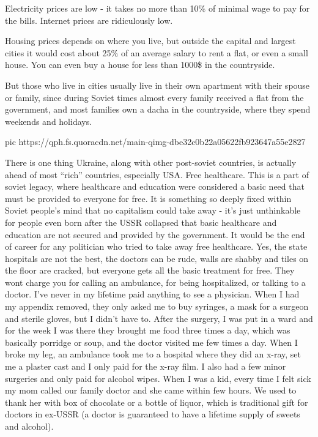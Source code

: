 Electricity prices are low - it takes no more than 10\% of minimal wage to pay
for the bills. Internet prices are ridiculously low.

Housing prices depends on where you live, but outside the capital and largest
cities it would cost about 25\% of an average salary to rent a flat, or even a
small house. You can even buy a house for less than 1000\$ in the countryside.

But those who live in cities usually live in their own apartment with their
spouse or family, since during Soviet times almost every family received a flat
from the government, and most families own a dacha in the countryside, where
they spend weekends and holidays.

\ifcmt
	pic https://qph.fs.quoracdn.net/main-qimg-dbe32c0b22a05622fb923647a55e2827
\fi

There is one thing Ukraine, along with other post-soviet countries, is actually
ahead of most “rich” countries, especially USA. Free healthcare. This is a part
of soviet legacy, where healthcare and education were considered a basic need
that must be provided to everyone for free. It is something so deeply fixed
within Soviet people’s mind that no capitalism could take away - it’s just
unthinkable for people even born after the USSR collapsed that basic healthcare
and education are not secured and provided by the government. It would be the
end of career for any politician who tried to take away free healthcare. Yes,
the state hospitals are not the best, the doctors can be rude, walls are shabby
and tiles on the floor are cracked, but everyone gets all the basic treatment
for free. They wont charge you for calling an ambulance, for being
hospitalized, or talking to a doctor. I’ve never in my lifetime paid anything
to see a physician. When I had my appendix removed, they only asked me to buy
syringes, a mask for a surgeon and sterile gloves, but I didn’t have to. After
the surgery, I was put in a ward and for the week I was there they brought me
food three times a day, which was basically porridge or soup, and the doctor
visited me few times a day. When I broke my leg, an ambulance took me to a
hospital where they did an x-ray, set me a plaster cast and I only paid for the
x-ray film. I also had a few minor surgeries and only paid for alcohol wipes.
When I was a kid, every time I felt sick my mom called our family doctor and
she came within few hours. We used to thank her with box of chocolate or a
bottle of liquor, which is traditional gift for doctors in ex-USSR (a doctor is
guaranteed to have a lifetime supply of sweets and alcohol).

